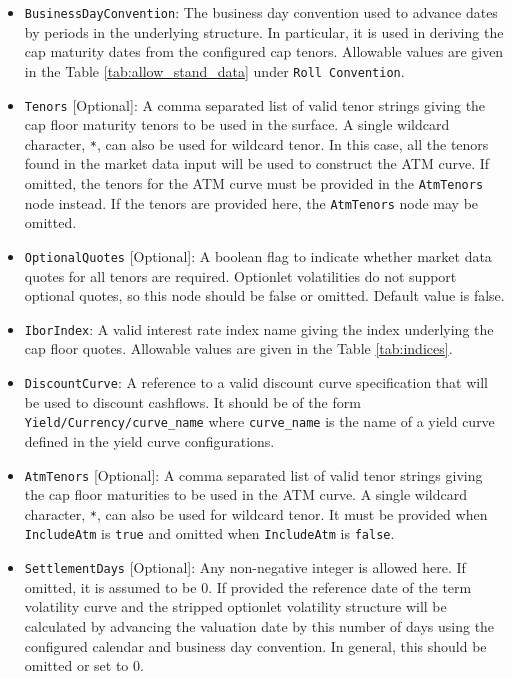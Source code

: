 \begin{itemize}
\item \lstinline!BusinessDayConvention!:
The business day convention used to advance dates by periods in the underlying structure. In particular, it is used in deriving the cap maturity dates from the configured cap tenors. Allowable values are given in the Table \ref{tab:allow_stand_data} under \lstinline!Roll Convention!.

\item \lstinline!Tenors! [Optional]:
A comma separated list of valid tenor strings giving the cap floor maturity tenors to be used in the surface. A single wildcard character, \lstinline!*!, can also be used for wildcard tenor. In this case, all the tenors found in the market data input will be used to construct the ATM curve. If omitted, the tenors for the ATM curve must be provided in the \lstinline!AtmTenors! node instead. If the tenors are provided here, the \lstinline!AtmTenors! node may be omitted.

\item \lstinline!OptionalQuotes! [Optional]:
A boolean flag to indicate whether market data quotes for all tenors are required. Optionlet volatilities do not support optional quotes, so this node should be false or omitted. Default value is false.

\item \lstinline!IborIndex!:
A valid interest rate index name giving the index underlying the cap floor quotes. Allowable values are given in the Table \ref{tab:indices}.

\item \lstinline!DiscountCurve!:
A reference to a valid discount curve specification that will be used to discount cashflows. It should be of the form \lstinline!Yield/Currency/curve_name! where \lstinline!curve_name! is the name of a yield curve defined in the yield curve configurations.

\item \lstinline!AtmTenors! [Optional]:
A comma separated list of valid tenor strings giving the cap floor maturities to be used in the ATM curve. A single wildcard character, \lstinline!*!, can also be used for wildcard tenor. It must be provided when \lstinline!IncludeAtm! is \lstinline!true! and omitted when \lstinline!IncludeAtm! is \lstinline!false!.

\item \lstinline!SettlementDays! [Optional]:
Any non-negative integer is allowed here. If omitted, it is assumed to be 0. If provided the reference date of the term volatility curve and the stripped optionlet volatility structure will be calculated by advancing the valuation date by this number of days using the configured calendar and business day convention. In general, this should be omitted or set to 0.


\end{itemize}
